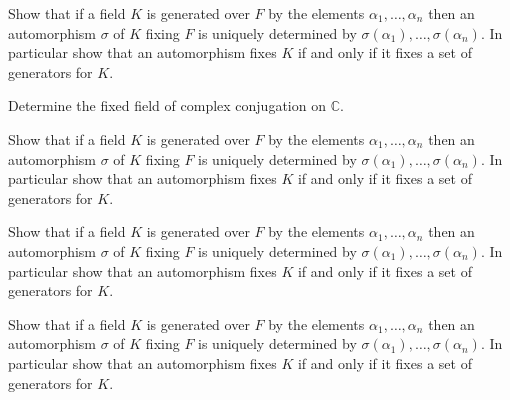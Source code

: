 \documentclass[12pt,letterpaper]{hmcpset}
\newcommand{\Cc}{\mathbb{C}}
\begin{document}

\begin{problem}[14.1.1a]
  Show that if a field $K$ is generated over $F$ by the elements $\alpha_1, \dots , \alpha_n$ then an automorphism $\sigma$ of $K$ fixing $F$ is uniquely determined by $\sigma(\alpha_1), \dots, \sigma(\alpha_n)$. In particular show that an automorphism fixes $K$ if and only if it fixes a set of generators for $K$.
\end{problem}
\begin{solution}
\vfill
\end{solution}
\newpage

\begin{problem}[14.1.3]
  Determine the fixed field of complex conjugation on $\Cc$.
\end{problem}
\begin{solution}
\vfill
\end{solution}
\newpage

\begin{problem}[14.1.7]
  Show that if a field $K$ is generated over $F$ by the elements $\alpha_1, \dots , \alpha_n$ then an automorphism $\sigma$ of $K$ fixing $F$ is uniquely determined by $\sigma(\alpha_1), \dots, \sigma(\alpha_n)$. In particular show that an automorphism fixes $K$ if and only if it fixes a set of generators for $K$.
\end{problem}
\begin{solution}
\vfill
\end{solution}
\newpage

\begin{problem}[14.2.3]
  Show that if a field $K$ is generated over $F$ by the elements $\alpha_1, \dots , \alpha_n$ then an automorphism $\sigma$ of $K$ fixing $F$ is uniquely determined by $\sigma(\alpha_1), \dots, \sigma(\alpha_n)$. In particular show that an automorphism fixes $K$ if and only if it fixes a set of generators for $K$.
\end{problem}
\begin{solution}
\vfill
\end{solution}
\newpage

\begin{problem}[14.2.13]
  Show that if a field $K$ is generated over $F$ by the elements $\alpha_1, \dots , \alpha_n$ then an automorphism $\sigma$ of $K$ fixing $F$ is uniquely determined by $\sigma(\alpha_1), \dots, \sigma(\alpha_n)$. In particular show that an automorphism fixes $K$ if and only if it fixes a set of generators for $K$.
\end{problem}
\begin{solution}
\vfill
\end{solution}
\newpage
\end{document}

